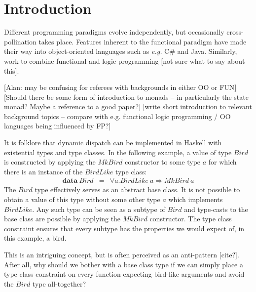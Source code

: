 \documentclass[runningheads,a4paper]{llncs}
\newcommand{\todo}[1]{[{\color{blue}#1}]}
\begin{document}
\section{Introduction}
\label{sec:introduction}

Different programming paradigms evolve independently, but occasionally cross-pollination takes place. Features inherent to the functional paradigm have made their way into object-oriented languages such as \emph{e.g.} C\# and Java. Similarly, work to combine functional and logic programming \todo{not sure what to say about this}.

\todo{Alan: may be confusing for referees with backgrounds in either OO or FUN}
\todo{Should there be some form of introduction to monads -- in particularly the state monad? Maybe a reference to a good paper?}
\todo{write short introduction to relevant background topics -- compare with e.g. functional logic programming / OO languages being influenced by FP?}

It is folklore that dynamic dispatch can be implemented in Haskell with existential types and type classes. In the following example, a value of type $\mathit{Bird}$ is constructed by applying the $\mathit{MkBird}$ constructor to some type $a$ for which there is an instance of the $\mathit{BirdLike}$ type class:
\begin{displaymath}
\begin{array}{lcl}
\mathbf{data}~\mathit{Bird} & = & \forall a. \mathit{BirdLike}~a \Rightarrow \mathit{MkBird}~a
\end{array}
\end{displaymath}
The $\mathit{Bird}$ type effectively serves as an abstract base class. It is not possible to obtain a value of this type without some other type $a$ which implements $\mathit{BirdLike}$. Any such type can be seen as a subtype of $\mathit{Bird}$ and type-casts to the base class are possible by applying the $\mathit{MkBird}$ constructor. The type class constraint ensures that every subtype has the properties we would expect of, in this example, a bird.

This is an intriguing concept, but is often perceived as an anti-pattern \todo{cite?}. After all, why should we bother with a base class type if we can simply place a type class constraint on every function expecting bird-like arguments and avoid the $\mathit{Bird}$ type all-together?
\end{document}
